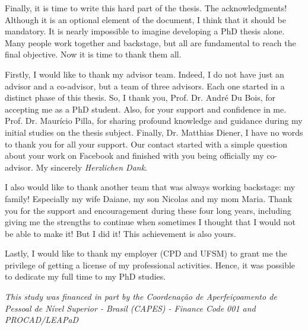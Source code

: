 Finally, it is time to write this hard part of the thesis. The acknowledgments! Although it is an optional element of the document, I think that it should be mandatory. It is nearly impossible to imagine developing a PhD thesis alone. Many people work together and backstage, but all are fundamental to reach the final objective. Now it is time to thank them all.

\vspace*{0.5cm}

Firstly, I would like to thank my advisor team. Indeed, I do not have just an advisor and a co-advisor, but a team of three advisors. Each one started in a distinct phase of this thesis. So, I thank you, Prof. Dr. André Du Bois, for accepting me as a PhD student. Also, for your support and confidence in me. Prof. Dr. Maurício Pilla, for sharing profound knowledge and guidance during my initial studies on the thesis subject. Finally, Dr. Matthias Diener, I have no words to thank you for all your support. Our contact started with a simple question about your work on Facebook and finished with you being officially my co-advisor. My sincerely \textit{Herzlichen Dank}.

\vspace*{0.5cm}

I also would like to thank another team that was always working backstage: my family! Especially my wife Daiane, my son Nicolas and my mom Maria. Thank you for the support and encouragement during these four long years, including giving me the strengths to continue when sometimes I thought that I would not be able to make it! But I did it! This achievement is also yours.

\vspace*{0.5cm}

Lastly, I would like to thank my employer (CPD and UFSM) to grant me the privilege of getting a license of my professional activities. Hence, it was possible to dedicate my full time to my PhD studies.

\vfill
\textit{This study was financed in part by the Coordena\c{c}\~ao de Aperfei\c{c}oamento de Pessoal de N\'ivel Superior - Brasil (CAPES) - Finance Code 001 and PROCAD/LEAPaD}
